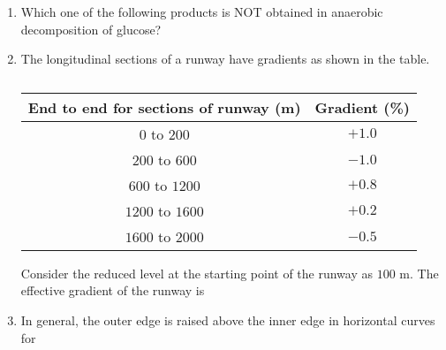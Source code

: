 \documentclass[journal,12pt,onecolumn]{article}
\theoremstyle{remark}
\begin{document}
\begin{enumerate}
    \item Which one of the following products is NOT obtained in anaerobic decomposition
    of glucose?
    
    \hfill{}
    \begin{enumerate}
    \end{enumerate}

    \item The longitudinal sections of a runway have gradients as shown in the table.
    \begin{table}[H]
        \centering
        \begin{tabular}{|c|c|}
        \hline
        \textbf{End to end for sections of runway (m)} & \textbf{Gradient (\%)} \\ \hline
        $0$ to $200$ & $+1.0$ \\
        $200$ to $600$ & $-1.0$ \\
        $600$ to $1200$ & $+0.8$ \\
        $1200$ to $1600$ & $+0.2$ \\
        $1600$ to $2000$ & $-0.5$ \\ \hline
        \end{tabular}
        \caption{}
        \label{tab:q27}
    \end{table}
    Consider the reduced level  at the starting point of the runway as $100$ m.
    The effective gradient of the runway is
    
    \hfill{}
    \begin{enumerate}
    \end{enumerate}
    
    \item In general, the outer edge is raised above the inner edge in horizontal curves for
    

\end{enumerate}
\end{document}
